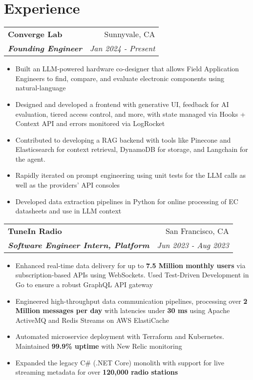\documentclass[letterpaper]{article}
\makeatletter
\newcommand{\resumeItemWithoutTitle}[1]{
  \item\small{
    {#1 \vspace{-2pt}}
  }
}
\newcommand{\resumeSubheading}[4]{
    \begin{tabular*}{\textwidth}{l@{\extracolsep{\fill}}r}
        \textbf{#1} & #2 \\
        \textbf{\textit{#3}} & \textit{\small #4} \\
    \end{tabular*}\vspace{-10pt}
}
\newcommand{\shortSection}[1]{
    \vspace{-6pt}
    \section{#1}
}
\newcommand{\resumeItemListStart}{\begin{itemize}}
\newcommand{\resumeItemListEnd}{\end{itemize}}
\makeatother
\begin{document}
\shortSection{Experience}
\vspace{5pt}
\resumeSubheading
{Converge Lab}{Sunnyvale, CA}
{Founding Engineer}{Jan 2024 - Present}
\vspace{2pt}
\resumeItemListStart
\resumeItemWithoutTitle{Built an LLM-powered hardware co-designer that allows Field Application Engineers to find, compare, and evaluate electronic components using natural-language}
\resumeItemWithoutTitle{Designed and developed a frontend with generative UI, feedback for AI evaluation, tiered access control, and more, with state managed via Hooks + Context API and errors monitored via LogRocket}
\resumeItemWithoutTitle{Contributed to developing a RAG backend with tools like Pinecone and Elasticsearch for context retrieval, DynamoDB for storage, and Langchain for the agent.}
\resumeItemWithoutTitle{Rapidly iterated on prompt engineering using unit tests for the LLM calls as well as the providers' API consoles}
\resumeItemWithoutTitle{Developed data extraction pipelines in Python for online processing of EC datasheets and use in LLM context}
\resumeItemListEnd

\resumeSubheading
{TuneIn Radio}{San Francisco, CA}
{Software Engineer Intern, Platform}{Jun 2023 - Aug 2023}
\vspace{2pt}
\resumeItemListStart
\resumeItemWithoutTitle{Enhanced real-time data delivery for up to \textbf{7.5 Million monthly users} via subscription-based APIs using WebSockets. Used Test-Driven Development in Go to ensure a robust GraphQL API gateway}
\resumeItemWithoutTitle{Engineered high-throughput data communication pipelines, processing over \textbf{2 Million messages per day} with latencies under \textbf{30 ms} using Apache ActiveMQ and Redis Streams on AWS ElastiCache}
\resumeItemWithoutTitle{Automated microservice deployment with Terraform and Kubernetes. Maintained \textbf{99.9\% uptime} with New Relic monitoring}
\resumeItemWithoutTitle{Expanded the legacy C\# (.NET Core) monolith with support for live streaming metadata for over \textbf{120,000 radio stations}}
\resumeItemListEnd
\end{document}
